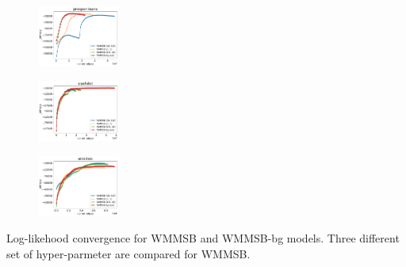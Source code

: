 \begin{subfigure}
         \centering
      \includegraphics[width=0.24\textwidth]{fig/prosper-loans_fig__entropy}
\end{subfigure}                                                             
\begin{subfigure}                                                           
         \centering                                                         
      \includegraphics[width=0.24\textwidth]{fig/slashdot_fig__entropy}
\end{subfigure}                                                             
\begin{subfigure}                                                           
         \centering                                                         
      \includegraphics[width=0.24\textwidth]{fig/wiki-link_fig__entropy}
\end{subfigure}                                                             
\caption{Log-likehood convergence for WMMSB and WMMSB-bg models. Three different set of hyper-parmeter are compared for WMMSB.}

